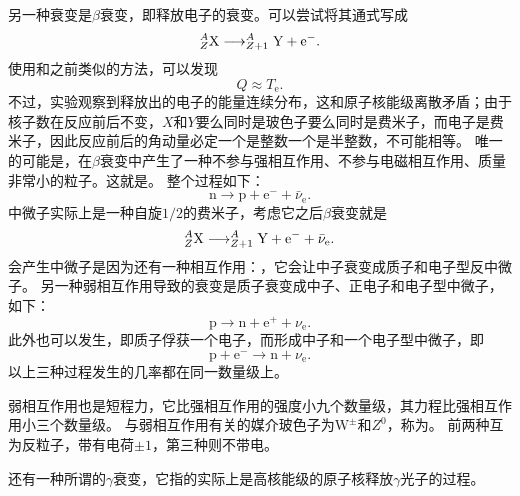另一种衰变是$\beta$衰变，即释放电子的衰变。可以尝试将其通式写成
\[
    \nuclear{X}{A}{Z} \longrightarrow \nuclear{Y}{A}{Z+1} + \text{e}^-.
\]
使用和之前类似的方法，可以发现
\begin{equation}
    Q \approx T_\text{e}.
\end{equation}
不过，实验观察到释放出的电子的能量连续分布，这和原子核能级离散矛盾；由于核子数在反应前后不变，$X$和$Y$要么同时是玻色子要么同时是费米子，而电子是费米子，因此反应前后的角动量必定一个是整数一个是半整数，不可能相等。
唯一的可能是，在$\beta$衰变中产生了一种不参与强相互作用、不参与电磁相互作用、质量非常小的粒子。这就是。
整个过程如下：
\[
    \text{n} \longrightarrow \text{p} + \text{e}^- + \bar{\nu}_\text{e}.
\]
中微子实际上是一种自旋$1/2$的费米子，考虑它之后$\beta$衰变就是
\[
    \nuclear{X}{A}{Z} \longrightarrow \nuclear{Y}{A}{Z+1} + \text{e}^- + \bar{\nu}_\text{e}.
\]
会产生中微子是因为还有一种相互作用：，它会让中子衰变成质子和电子型反中微子。
另一种弱相互作用导致的衰变是质子衰变成中子、正电子和电子型中微子，如下：
\[
    \text{p} \longrightarrow \text{n} + \text{e}^+ + \nu_\text{e}.
\]
此外也可以发生，即质子俘获一个电子，而形成中子和一个电子型中微子，即
\[
    \text{p} + \text{e}^- \longrightarrow \text{n} + \nu_\text{e}.
\]
以上三种过程发生的几率都在同一数量级上。

弱相互作用也是短程力，它比强相互作用的强度小九个数量级，其力程比强相互作用小三个数量级。
与弱相互作用有关的媒介玻色子为$\text{W}^\pm$和$Z^0$，称为。
前两种互为反粒子，带有电荷$\pm 1$，第三种则不带电。

还有一种所谓的$\gamma$衰变，它指的实际上是高核能级的原子核释放$\gamma$光子的过程。
